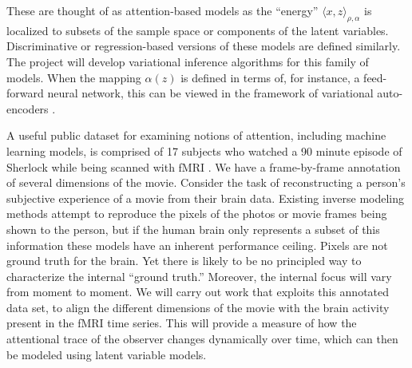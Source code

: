 These are thought of as attention-based models as the ``energy''
$\langle x, z\rangle_{\rho,\alpha}$ is localized to subsets of the
sample space or components of the latent variables. Discriminative or regression-based versions of these
models are defined similarly. The project will develop variational
inference algorithms for this family of models. When the mapping 
$\alpha(z)$ is defined in terms of, for instance, a feed-forward
neural network, this can be viewed in the framework of variational auto-encoders
\citep{kingma13}.


A useful public
dataset for examining notions of attention, including machine
learning models, is comprised of 17 subjects who watched a 90 minute
episode of Sherlock while being scanned with fMRI
\citep{chen17,baldassano17}. We have a
frame-by-frame annotation of several dimensions of the movie.
Consider the task of reconstructing a person's subjective experience
of a movie from their brain data. Existing inverse modeling methods
attempt to reproduce the pixels of the photos or movie frames being
shown to the person, but if the human brain only represents a subset
of this information these models have an inherent performance
ceiling. Pixels are not ground truth for the brain. Yet 
there is likely to be no principled way to characterize the internal ``ground
truth.'' Moreover, the internal focus will vary from moment to moment. 
We will carry out work that exploits this annotated data set,
to align the different dimensions of the movie with the brain activity
present in the fMRI time series. This will provide a measure of
how the attentional trace of the observer changes dynamically over
time, which can then be modeled using latent variable models.

